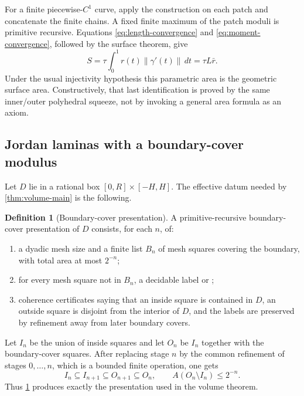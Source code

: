\documentclass[11pt]{article}
\theoremstyle{definition}
\newtheorem{definition}[theorem]{Definition}
\newcommand{\code}[1]{\texttt{\detokenize{#1}}}
\newcommand{\norm}[1]{\left\lVert#1\right\rVert}
\begin{document}
For a finite piecewise-$C^1$ curve, apply the construction on each patch and
concatenate the finite chains.  A fixed finite maximum of the patch moduli is
primitive recursive.  Equations \eqref{eq:length-convergence} and
\eqref{eq:moment-convergence}, followed by the surface theorem, give
\begin{equation}
 S=\tau\int_0^1r(t)\norm{\gamma'(t)}\,dt
  =\tau L\bar r.
 \label{eq:analytic-surface}
\end{equation}
Under the usual injectivity hypothesis this parametric area is the geometric
surface area.  Constructively, that last identification is proved by the same
inner/outer polyhedral squeeze, not by invoking a general area formula as an
axiom.

\subsection{Jordan laminas with a boundary-cover modulus}

Let $D$ lie in a rational box $[0,R]\times[-H,H]$.  The effective datum needed
by \cref{thm:volume-main} is the following.

\begin{definition}[Boundary-cover presentation]
\label{def:boundary-cover}
A primitive-recursive boundary-cover presentation of $D$ consists, for each
$n$, of:
\begin{enumerate}[label=(\roman*),leftmargin=2.3em]
\item a dyadic mesh size and a finite list $B_n$ of mesh squares covering the
boundary, with total area at most $2^{-n}$;
\item for every mesh square not in $B_n$, a decidable label
\code{inside} or \code{outside};
\item coherence certificates saying that an inside square is contained in
$D$, an outside square is disjoint from the interior of $D$, and the labels
are preserved by refinement away from later boundary covers.
\end{enumerate}
\end{definition}

Let $I_n$ be the union of inside squares and let $O_n$ be $I_n$ together with
the boundary-cover squares.  After replacing stage $n$ by the common
refinement of stages $0,\ldots,n$, which is a bounded finite operation, one
gets
\[
 I_n\subseteq I_{n+1}\subseteq O_{n+1}\subseteq O_n,
 \qquad A(O_n\setminus I_n)\leq2^{-n}.
\]
Thus \cref{def:boundary-cover} produces exactly the presentation used in the
volume theorem.
\end{document}
